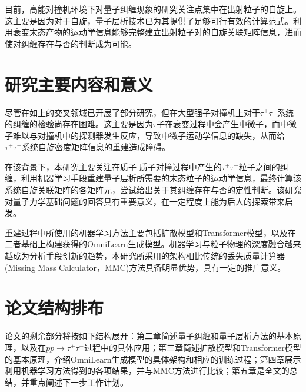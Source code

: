 目前，高能对撞机环境下对量子纠缠现象的研究关注点集中在出射粒子的自旋上\cite{ref7}。这主要是因为对于自旋，量子层析技术已为其提供了足够可行有效的计算范式\cite{ref8}。利用衰变末态产物的运动学信息能够完整建立出射粒子对的自旋关联矩阵信息，进而使对纠缠存在与否的判断成为可能。

\section{研究主要内容和意义}
\label{sec:onepthree}

尽管在如上的交叉领域已开展了部分研究，但在大型强子对撞机上对于$ \tau^+ \tau^- $系统的纠缠的检验尚存在困难。这主要是因为$ \tau $子在衰变过程中会产生中微子，而中微子难以与对撞机中的探测器发生反应，导致中微子运动学信息的缺失，从而给$ \tau^+ \tau^- $系统自旋密度矩阵信息的重建造成障碍。

在该背景下，本研究主要关注在质子-质子对撞过程中产生的$ \tau^+ \tau^- $粒子之间的纠缠，利用机器学习手段重建量子层析所需要的末态粒子的运动学信息，最终计算该系统自旋关联矩阵的各矩阵元，尝试给出关于其纠缠存在与否的定性判断。该研究对量子力学基础问题的回答具有重要意义，在一定程度上能为后人的探索带来启发。

重建过程中所使用的机器学习方法主要包括扩散模型\cite{ref9, ref10}和Transformer模型\cite{ref11}，以及在二者基础上构建获得的OmniLearn生成模型\cite{ref12, ref7}。机器学习与粒子物理的深度融合越来越成为分析手段创新的趋势，本研究所采用的架构相比传统的丢失质量计算器(Missing Mass Calculator，MMC)方法\cite{ref25}具备明显优势，具有一定的推广意义。

\section{论文结构排布}
\label{sec:onepfour}

论文的剩余部分将按如下结构展开：第二章简述量子纠缠和量子层析方法的基本原理，以及在$ pp\rightarrow \tau^+ \tau^- $过程中的具体应用；第三章简述扩散模型和Transformer模型的基本原理，介绍OmniLearn生成模型的具体架构和相应的训练过程；第四章展示利用机器学习方法得到的各项结果，并与MMC方法进行比较；第五章是全文的总结，并重点阐述下一步工作计划。

